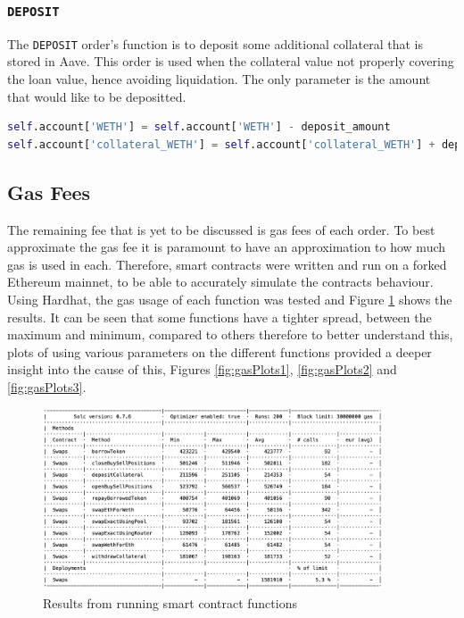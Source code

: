 \subsubsection{\texttt{DEPOSIT}}
The \texttt{DEPOSIT} order's function is to deposit some additional collateral that is stored in Aave. This order is used when the collateral value not properly covering the loan value, hence avoiding liquidation. The only parameter is the amount that would like to be depositted. 
\vspace{5mm}
\begin{lstlisting}[language=Python]
self.account['WETH'] = self.account['WETH'] - deposit_amount
self.account['collateral_WETH'] = self.account['collateral_WETH'] + deposit_amount
\end{lstlisting}

\subsection{Gas Fees}
The remaining fee that is yet to be discussed is gas fees of each order. To best approximate the gas fee it is paramount to have an approximation to how much gas is used in each. Therefore, smart contracts were written and run on a forked Ethereum mainnet, to be able to accurately simulate the contracts behaviour. Using Hardhat, the gas usage of each function was tested and Figure \ref{fig:gasResult} shows the results. It can be seen that some functions have a tighter spread, between the maximum and minimum, compared to others therefore to better understand this, plots of using various parameters on the different functions provided a deeper insight into the cause of this, Figures \ref{fig:gasPlots1}, \ref{fig:gasPlots2} and \ref{fig:gasPlots3}.
\begin{figure}[!htb]
    \centering
    \includegraphics[width=0.9\textwidth]{project/Images/gas_fee_results.png}
    \caption{Results from running smart contract functions \label{fig:gasResult}}
\end{figure}

